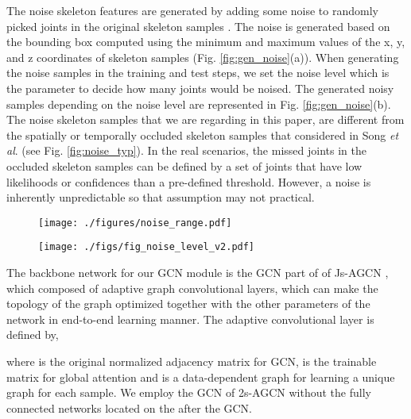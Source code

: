 \documentclass[runningheads]{llncs}
\newcommand{\etal}{\textit{et al}. }
\begin{document}
The noise skeleton features  are generated by adding some noise to randomly picked joints in the original skeleton samples . The noise is generated based on the bounding box computed using the minimum and maximum values of the x, y, and z coordinates of skeleton samples (Fig. \ref{fig:gen_noise}(a)). When generating the noise samples in the training and test steps, we set the noise level which is the parameter to decide how many joints would be noised. The generated noisy samples depending on the noise level are represented in Fig. \ref{fig:gen_noise}(b). The noise skeleton samples that we are regarding in this paper, are different from the spatially or temporally occluded skeleton samples that considered in Song \etal \cite{song2019richly} (see Fig. \ref{fig:noise_typ}). In the real scenarios, the missed joints in the occluded skeleton samples can be defined by a set of joints that have low likelihoods or confidences than a pre-defined threshold. However, a noise is inherently unpredictable so that assumption may not practical. 

 \begin{figure*}[t]
        \centering
        \begin{subfigure}{0.23\textwidth}
            \texttt{[image: ./figures/noise\_range.pdf]}
	\caption{}
        \end{subfigure}
        \hfill
        \begin{subfigure}{0.73\textwidth}
            \texttt{[image: ./figs/fig\_noise\_level\_v2.pdf]}
	\caption{}
        \end{subfigure}
        \hfill
        \caption{Illustrations of how to set the candidate scope for generating noise joint and the examples of noise skeleton samples depending on the noise level. (a) illustrates that how to define the scope for generating noise joint using a given skeleton sample. (b) shows the noise skeleton samples created from original sample depending on the noise level.}
\label{fig:gen_noise}  
\vspace{-3ex}
\end{figure*}

The backbone network for our GCN module  is the GCN part of of Js-AGCN \cite{shi2019two}, which composed of adaptive graph convolutional layers, which can make the topology of the graph optimized together with the other parameters of the network in end-to-end learning manner. The adaptive convolutional layer is defined by,

where  is the original normalized adjacency matrix for GCN,  is the trainable matrix for global attention and  is a data-dependent graph for learning a unique graph for each sample. We employ the GCN of 2s-AGCN without the fully connected networks located on the after the GCN. 
\end{document}
